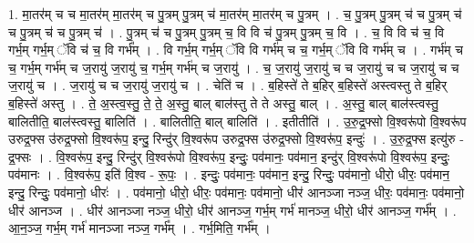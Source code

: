 \documentclass[17pt]{extarticle}
\begin{document}
1. मा॒तर॑म् च च मा॒तर॑म् मा॒तर॑म् च पु॒त्रम् पु॒त्रम् च॑ मा॒तर॑म् मा॒तर॑म् च पु॒त्रम् । . च॒ पु॒त्रम् पु॒त्रम् च॑ च पु॒त्रम् च॑ च पु॒त्रम् च॑ च पु॒त्रम् च॑ । . पु॒त्रम् च॑ च पु॒त्रम् पु॒त्रम् च॒ वि वि च॑ पु॒त्रम् पु॒त्रम् च॒ वि । . च॒ वि वि च॑ च॒ वि गर्भ॒म् गर्भ॒म् ॅवि च॑ च॒ वि गर्भ᳚म् । . वि गर्भ॒म् गर्भ॒म् ॅवि वि गर्भ॑म् च च॒ गर्भ॒म् ॅवि वि गर्भ॑म् च । . गर्भ॑म् च च॒ गर्भ॒म् गर्भ॑म् च ज॒रायु॑ ज॒रायु॑ च॒ गर्भ॒म् गर्भ॑म् च ज॒रायु॑ । . च॒ ज॒रायु॑ ज॒रायु॑ च च ज॒रायु॑ च च ज॒रायु॑ च च ज॒रायु॑ च । . ज॒रायु॑ च च ज॒रायु॑ ज॒रायु॑ च । . चेति॑ च । . ब॒हिस्ते॑ ते ब॒हिर् ब॒हिस्ते॑ अस्त्वस्तु ते ब॒हिर् ब॒हिस्ते॑ अस्तु । . ते॒ अ॒स्त्व॒स्तु॒ ते॒ ते॒ अ॒स्तु॒ बाल् बाल॑स्तु ते ते अस्तु॒ बाल् । . अ॒स्तु॒ बाल् बाल॑स्त्वस्तु॒ बालितीति॒ बाल॑स्त्वस्तु॒ बालिति॑ । . बालितीति॒ बाल् बालिति॑ । . इतीतीति॑ । . उ॒रु॒द्र॒फ्सो वि॒श्वरू॑पो वि॒श्वरू॑प उरुद्र॒फ्स उ॑रुद्र॒फ्सो वि॒श्वरू॑प॒ इन्दु॒ रिन्दु॑र् वि॒श्वरू॑प उरुद्र॒फ्स उ॑रुद्र॒फ्सो वि॒श्वरू॑प॒ इन्दुः॑ । . उ॒रु॒द्र॒फ्स इत्यु॑रु - द्र॒फ्सः । . वि॒श्वरू॑प॒ इन्दु॒ रिन्दु॑र् वि॒श्वरू॑पो वि॒श्वरू॑प॒ इन्दुः॒ पव॑मानः॒ पव॑मान॒ इन्दु॑र् वि॒श्वरू॑पो वि॒श्वरू॑प॒ इन्दुः॒ पव॑मानः । . वि॒श्वरू॑प॒ इति॑ वि॒श्व - रू॒पः॒ । . इन्दुः॒ पव॑मानः॒ पव॑मान॒ इन्दु॒ रिन्दुः॒ पव॑मानो॒ धीरो॒ धीरः॒ पव॑मान॒ इन्दु॒ रिन्दुः॒ पव॑मानो॒ धीरः॑ । . पव॑मानो॒ धीरो॒ धीरः॒ पव॑मानः॒ पव॑मानो॒ धीर॑ आनञ्जा नञ्ज॒ धीरः॒ पव॑मानः॒ पव॑मानो॒ धीर॑ आनञ्ज । . धीर॑ आनञ्जा नञ्ज॒ धीरो॒ धीर॑ आनञ्ज॒ गर्भ॒म् गर्भ॑ मानञ्ज॒ धीरो॒ धीर॑ आनञ्ज॒ गर्भ᳚म् । . आ॒न॒ञ्ज॒ गर्भ॒म् गर्भ॑ मानञ्जा नञ्ज॒ गर्भ᳚म् । . गर्भ॒मिति॒ गर्भ᳚म् । \newline
\end{document}
